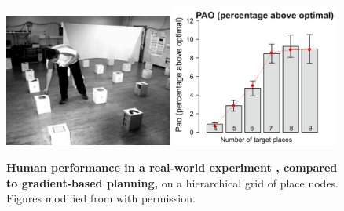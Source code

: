 \begin{figure}[!ht]
	\begin{center}
		\includegraphics[width=0.49\textwidth]{img/wienerexp}
		\includegraphics[width=0.49\textwidth]{img/wieneretal2009_spatial_tsp_comparison.png}
	\end{center}
	\caption{
		{\bf Human performance in a real-world experiment \citep{Wiener2009}, compared to gradient-based planning,} on a hierarchical grid of place nodes. Figures modified from \citep{Wiener2009} with permission.
	}
	\label{tsp2}
\end{figure}


